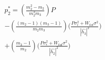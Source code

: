 \documentclass[preview]{standalone}
\begin{document}
\begin{align*}
p_2^\ast = \left(\frac{m_2^2 - m_2}{m_2^2 m_3}\right) P \\ - \left(\frac{(m_2 - 1)(m_3 - 1)}{m_2 m_3}\right) \Bigg( \frac{P \sigma_\epsilon^2 + W_{tot} \sigma^2 }{ \left| \hat{h_3} \right| ^2 } \Bigg) \\ + \left(\frac{m_3 - 1}{m_2}\right) \Bigg( \frac{P \sigma_\epsilon^2 + W_{tot} \sigma^2}{\left|\hat{h_2}\right|^2} \Bigg)
\end{align*}
\end{document}
